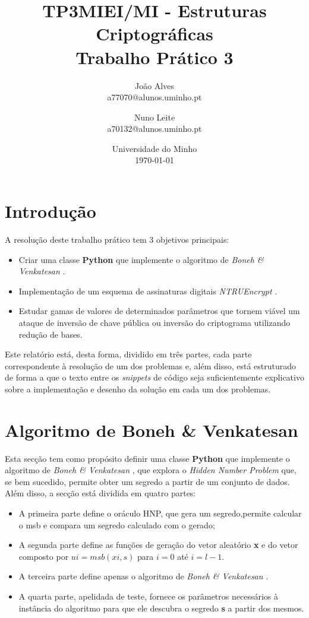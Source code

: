 \documentclass[11pt]{article}
\title{TP3}
\title{MIEI/MI - Estruturas Criptográficas\\
            \large Trabalho Prático 3}
\author{
        João Alves \\
        a77070@alunos.uminho.pt
        \and
        Nuno Leite \\
        a70132@alunos.uminho.pt
    }
\date{
        Universidade do Minho\\
        \today
    }
\providecommand{\tightlist}{%
      \setlength{\itemsep}{0pt}\setlength{\parskip}{0pt}}
\begin{document}
    
    
    \maketitle
    
    

    

    \hypertarget{introduuxe7uxe3o}{%
\section{Introdução}\label{introduuxe7uxe3o}}

    A resolução deste trabalho prático tem 3 objetivos principais:

\begin{itemize}
\tightlist
\item
  Criar uma classe \textbf{Python} que implemente o algoritmo de
  \emph{Boneh \& Venkatesan} .
\item
  Implementação de um esquema de assinaturas digitais \emph{NTRUEncrypt}
  .
\item
  Estudar gamas de valores de determinados parâmetros que tornem viável
  um ataque de inversão de chave pública ou inversão do criptograma
  utilizando redução de bases.
\end{itemize}

Este relatório está, desta forma, dividido em três partes, cada parte
correspondente à resolução de um dos problemas e, além disso, está
estruturado de forma a que o texto entre os \emph{snippets} de código
seja suficientemente explicativo sobre a implementação e desenho da
solução em cada um dos problemas.

    \hypertarget{algoritmo-de-boneh-venkatesan}{%
\section{Algoritmo de Boneh \&
Venkatesan}\label{algoritmo-de-boneh-venkatesan}}

    Esta secção tem como propósito definir uma classe \textbf{Python} que
implemente o algoritmo de \emph{Boneh \& Venkatesan} , que explora o
\emph{Hidden Number Problem} que, se bem sucedido, permite obter um
segredo a partir de um conjunto de dados. Além disso, a secção está
dividida em quatro partes:

\begin{itemize}
\tightlist
\item
  A primeira parte define o oráculo HNP, que gera um segredo,permite
  calcular o msb e compara um segredo calculado com o gerado;
\item
  A segunda parte define as funções de geração do vetor aleatório
  \textbf{x} e do vetor composto por $ ui = msb(xi,s) $ para $ i=0 $
  até $ i = l - 1 $.
\item
  A terceira parte define apenas o algoritmo de \emph{Boneh \&
  Venkatesan} .
\item
  A quarta parte, apelidada de teste, fornece os parâmetros necessários
  à instância do algoritmo para que ele descubra o segredo \textbf{s} a
  partir dos mesmos.
\end{itemize}
\end{document}
